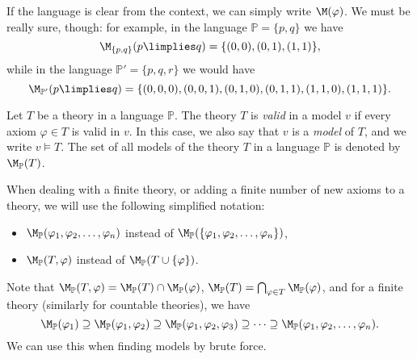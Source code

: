 If the language is clear from the context, we can simply write $\M(\varphi)$. We must be really sure, though: for example, in the language $\mathbb P = \{p,q\}$ we have 
$$
\M_{\{p,q\}}(p \limplies q) = \{(0,0),(0,1),(1,1)\},
$$
while in the language $\mathbb P' = \{p,q,r\}$ we would have
$$
\M_{\mathbb P'}(p \limplies q) = \{(0,0,0),(0,0,1),(0,1,0),(0,1,1),(1,1,0),(1,1,1)\}.
$$

\begin{definition}\label{definition:validity-of-theory}
    Let $T$ be a theory in a language $\mathbb P$. The theory $T$ is \emph{valid} in a model $v$ if every axiom $\varphi \in T$ is valid in $v$. In this case, we also say that $v$ is a \emph{model} of $T$, and we write $v \models T$. The set of all models of the theory $T$ in a language $\mathbb P$ is denoted by $\M_\mathbb P(T)$.    
\end{definition}

When dealing with a finite theory, or adding a finite number of new axioms to a theory, we will use the following simplified notation:
\begin{itemize}
    \item $\M_\mathbb P(\varphi_1, \varphi_2, \dots, \varphi_n)$ instead of $\M_\mathbb P(\{\varphi_1, \varphi_2, \dots, \varphi_n\})$,
    \item $\M_\mathbb P(T, \varphi)$ instead of $\M_\mathbb P(T \cup \{\varphi\})$.
\end{itemize}

Note that $\M_\mathbb P(T, \varphi) = \M_\mathbb P(T) \cap \M_\mathbb P(\varphi)$, $\M_\mathbb P(T) = \bigcap_{\varphi \in T} \M_\mathbb P(\varphi)$, and for a finite theory (similarly for countable theories), we have
$$
\M_\mathbb P(\varphi_1)\supseteq \M_\mathbb P(\varphi_1,\varphi_2)\supseteq \M_\mathbb P(\varphi_1,\varphi_2,\varphi_3)\supseteq\dots\supseteq\M_\mathbb P(\varphi_1,\varphi_2,\dots,\varphi_n).
$$
We can use this when finding models by brute force.

